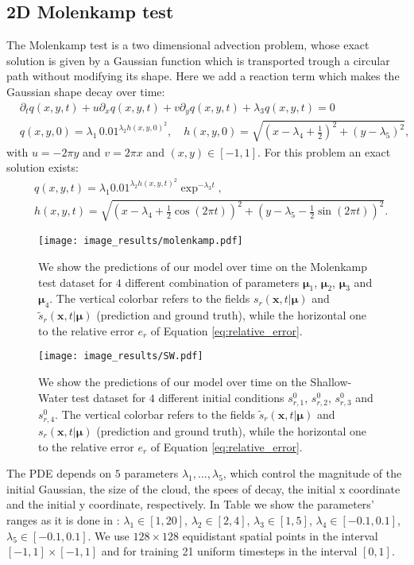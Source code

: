 \subsection{2D Molenkamp test}
\label{subsec:molenkamp_test}
The Molenkamp test is a two dimensional advection problem, whose exact solution is given by a Gaussian function which is transported trough a circular path without modifying its shape. Here we add a reaction term which makes the Gaussian shape decay over time:
\begin{equation}
\label{eq:molenkamp}
    \begin{aligned}
    &\partial_t q(x,y,t)+u\partial_x q(x,y,t) + v\partial_y q(x,y,t)+\lambda_3 q(x,y,t) = 0 \\
    &q(x,y,0) = \lambda_1\,0.01^{\lambda_2 h(x,y,0)^2},\quad h(x,y,0)=\sqrt{(x-\lambda_4+\frac{1}{2})^2+(y-\lambda_5)^2},
    \end{aligned}
\end{equation}
with $u=-2\pi y$ and $v = 2\pi x$ and $(x,y)\in[-1,1]$. For this problem an exact solution exists:
\begin{equation}
    \begin{aligned}
        &q(x,y,t) = \lambda_1 0.01^{\lambda_2 h(x,y,t)^2}\exp^{-\lambda_3 t},\\
        &h(x,y,t) = \sqrt{(x-\lambda_4+\frac{1}{2}\cos(2\pi t))^2+(y-\lambda_5-\frac{1}{2}\sin(2\pi t))^2}.
\end{aligned}
\end{equation}
\begin{figure}[h!]
  \centering
  \texttt{[image: image\_results/molenkamp.pdf]}
  \caption{We show the predictions of our model over time on the Molenkamp test dataset for $4$ different combination of parameters $\pmb{\mu}_1$, $\pmb{\mu}_2$, $\pmb{\mu}_3$ and $\pmb{\mu}_4$. The vertical colorbar refers to the fields $s_r(\mathbf{x},t|\pmb{\mu})$ and $\tilde{s}_r(\mathbf{x},t|\pmb{\mu})$ (prediction and ground truth), while the horizontal one to the relative error $e_r$ of Equation \ref{eq:relative_error}.} 
  \label{fig:molenkamp_fields}
\end{figure}
\begin{figure}[h!]
  \centering
  \texttt{[image: image\_results/SW.pdf]}
  \caption{We show the predictions of our model over time on the Shallow-Water test dataset for $4$ different initial conditions $s^0_{r,1}$, $s^0_{r,2}$, $s^0_{r,3}$ and $s^0_{r,4}$. The vertical colorbar refers to the fields $\tilde{s}_r(\mathbf{x},t|\pmb{\mu})$ and $s_r(\mathbf{x},t|\pmb{\mu})$ (prediction and ground truth), while the horizontal one to the relative error $e_r$ of Equation \ref{eq:relative_error}.} 
  \label{fig:SW}
\end{figure}
The PDE depends on $5$ parameters $\lambda_1,...,\lambda_5$, which control the magnitude of the initial Gaussian, the size of the cloud, the spees of decay, the initial x coordinate and the initial y coordinate, respectively. In Table we show the parameters' ranges as it is done in \cite{Alsayyari_2021}: $\lambda_1\in[1,20]$, $\lambda_2\in[2,4]$, $\lambda_3\in[1,5]$, $\lambda_4\in[-0.1,0.1]$, $\lambda_5\in[-0.1,0.1]$. We use $128\times 128$ equidistant spatial points in the interval $[-1,1]\times[-1,1]$ and for training 21 uniform timesteps in the interval $[0,1]$.
